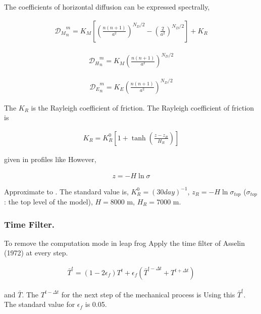 The coefficients of horizontal diffusion can be expressed spectrally,

\begin{eqnarray}
 {{\mathcal D}_M}_n^m = K_M
                      \left[ \left( \frac{n(n+1)}{a^2} \right)^{N_D/2}
                                - \left( \frac{2}{a^2} \right)^{N_D/2}
                      \right]
                  + K_R
\end{eqnarray}

\begin{eqnarray}
  {{\mathcal D}_H}_n^m = K_M \left( \frac{n(n+1)}{a^2} \right)^{N_D/2}
\end{eqnarray}

\begin{eqnarray}
  {{\mathcal D}_E}_n^m = K_E \left( \frac{n(n+1)}{a^2} \right)^{N_D/2}
\end{eqnarray}

The \(K_R\) is the Rayleigh coefficient of friction. The Rayleigh
coefficient of friction is

\begin{eqnarray}
  K_R = K_R^0 \left[ 1+\tanh \left( \frac{z-z_R}{H_R} \right) \right]
\end{eqnarray}

given in profiles like However,

\begin{eqnarray}
  z = - H \ln \sigma
\end{eqnarray}

Approximate to . The standard value is, \(K_R^0 = {(30day)}^{-1}\),
\(z_R = -H \ln \sigma_{top}\) (\(\sigma_{top}\) : the top level of the
model), \(H = 8000\) m, \(H_R = 7000\) m.

\hypertarget{time-filter.}{%
\subsubsection{Time Filter.}\label{time-filter.}}

To remove the computation mode in leap frog Apply the time filter of
Asselin (1972) at every step.

\begin{eqnarray}
  \bar{T}^{t}
    = ( 1-2 \epsilon_f ) T^{t}
    +  \epsilon_f
        \left( \bar{T}^{t-\Delta t} + T^{t+\Delta t} \right)
\end{eqnarray}

and \(\bar{T}\). The \(T^{t-\Delta t}\) for the next step of the
mechanical process is Using this \(\bar{T}^t\). The standard value for
\(\epsilon_f\) is 0.05.

